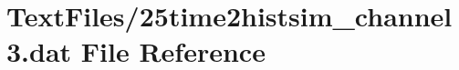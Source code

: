 \hypertarget{25time2histsim__channel3_8dat}{}\section{Text\+Files/25time2histsim\+\_\+channel3.dat File Reference}
\label{25time2histsim__channel3_8dat}
